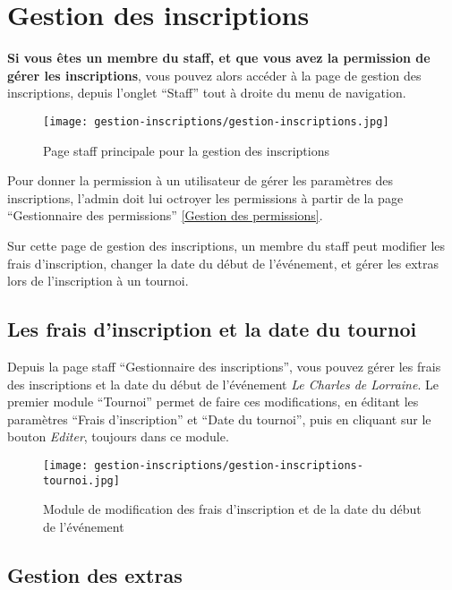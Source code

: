 \section{Gestion des inscriptions}

\textbf{Si vous êtes un membre du staff, et que vous avez la permission de gérer les inscriptions}, vous pouvez alors accéder à la page de gestion des inscriptions, depuis l'onglet \enquote{Staff} tout à droite du menu de navigation.

\begin{figure}[H]
\centering
\texttt{[image: gestion-inscriptions/gestion-inscriptions.jpg]}
\caption{Page staff principale pour la gestion des inscriptions}
\end{figure}

Pour donner la permission à un utilisateur de gérer les paramètres des inscriptions, l'admin doit lui octroyer les permissions à partir de la page \enquote{Gestionnaire des permissions} \ref{Gestion des permissions}.\newline

Sur cette page de gestion des inscriptions, un membre du staff peut modifier les frais d'inscription, changer la date du début de l'événement, et gérer les extras lors de l'inscription à un tournoi.

\subsection{Les frais d'inscription et la date du tournoi}

Depuis la page staff \enquote{Gestionnaire des inscriptions}, vous pouvez gérer les frais des inscriptions et la date du début de l'événement \textit{Le Charles de Lorraine}. Le premier module \enquote{Tournoi} permet de faire ces modifications, en éditant les paramètres \enquote{Frais d'inscription} et \enquote{Date du tournoi}, puis en cliquant sur le bouton \textit{Editer}, toujours dans ce module.

\begin{figure}[H]
\centering
\texttt{[image: gestion-inscriptions/gestion-inscriptions-tournoi.jpg]}
\caption{Module de modification des frais d'inscription et de la date du début de l'événement}
\end{figure}

\subsection{Gestion des extras}

